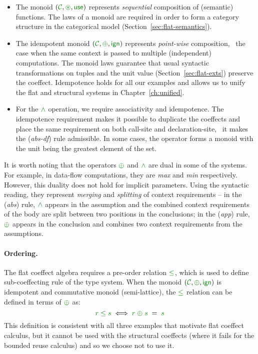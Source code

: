 \begin{itemize}
\item The monoid $(\C, \cseq, \cunit)$ represents \emph{sequential} composition of (semantic)
functions. The laws of a monoid are required in order to form a category structure in the 
categorical model (Section~\ref{sec:flat-semantics}).

\item The idempotent monoid $(\C, \cpar, \czero)$ represents \emph{point-wise} composition, 
\ie~the case when the same context is passed to multiple (independent) computations. The monoid 
laws guarantee that usual syntactic transformations on tuples and the unit value 
(Section~\ref{sec:flat-exts}) preserve the coeffect. Idempotence holds for all our examples
and allows us to unify the flat and structural systems in Chapter~\ref{ch:unified}.

\item For the $\czip$ operation, we require associativity and idempotence. The idempotence
requirement makes it possible to duplicate the coeffects and place the same requirement on both
call-site and declaration-site, \ie~it makes the (\emph{abs-df}) rule admissible. In some cases, 
the operator forms a monoid with the unit being the greatest element of the set. 
\end{itemize}

\noindent
It is worth noting that the operators $\cpar$ and $\czip$ are dual in some of the systems. For 
example, in data-flow computations, they are \emph{max} and \emph{min} respectively. However, this
duality does not hold for implicit parameters. Using the syntactic reading, they represent 
\emph{merging} and \emph{splitting} of context requirements -- in the (\emph{abs}) rule, 
$\czip$ appears in the assumption and the combined context requirements of the body are split 
between two positions in the conclusions; in the (\emph{app}) rule, $\cpar$ appears in the 
conclusion and combines two context requirements from the assumptions.

\paragraph{Ordering.}

The flat coeffect algebra requires a pre-order relation $\cleq$, which is used to define 
sub-coeffecting rule of the type system. When the monoid $(\C, \cpar, \czero)$ is idempotent
and commutative monoid (semi-lattice), the $\cleq$ relation can be defined in terms of $\cpar$ as:
%
\begin{equation*}
\cclrd{r} \;\cleq\; \cclrd{s} \;\Longleftrightarrow\; \cclrd{r} \;\cpar\; \cclrd{s} \;=\; \cclrd{s}
\end{equation*}
%
This definition is consistent with all three examples that motivate flat coeffect calculus, but
it cannot be used with the structural coeffects (where it fails for the bounded reuse 
calculus) and so we choose not to use it.

